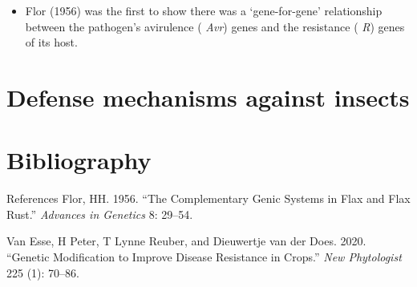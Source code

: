 \documentclass[11pt,dvipsnames,ignorenonframetext,aspectratio=169]{beamer}
\providecommand{\tightlist}{%
  \setlength{\itemsep}{0pt}\setlength{\parskip}{0pt}}
\newenvironment{CSLReferences}%
  {}%
  {\par}
\begin{document}
\begin{frame}{}
\protect\hypertarget{section-3}{}
\begin{itemize}
\tightlist
\item
  Flor (1956) was the first to show there was a `gene-for-gene'
  relationship between the pathogen's avirulence ( \emph{Avr}) genes and
  the resistance ( \emph{R}) genes of its host.
\end{itemize}
\end{frame}

\hypertarget{defense-mechanisms-against-insects}{%
\section{Defense mechanisms against
insects}\label{defense-mechanisms-against-insects}}

\hypertarget{bibliography}{%
\section{Bibliography}\label{bibliography}}

\begin{frame}{References}
\protect\hypertarget{references}{}
\hypertarget{refs}{}
\begin{CSLReferences}{1}{0}
\leavevmode{}%
Flor, HH. 1956. {``The Complementary Genic Systems in Flax and Flax
Rust.''} \emph{Advances in Genetics} 8: 29--54.

\leavevmode{}%
Van Esse, H Peter, T Lynne Reuber, and Dieuwertje van der Does. 2020.
{``Genetic Modification to Improve Disease Resistance in Crops.''}
\emph{New Phytologist} 225 (1): 70--86.

\end{CSLReferences}
\end{frame}
\end{document}
